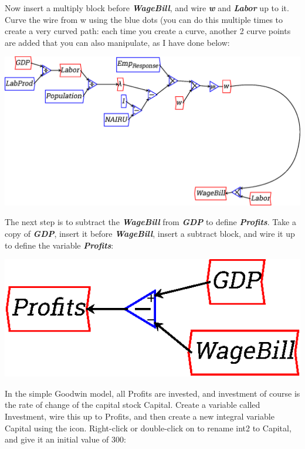 Now insert a multiply block before {\bf\em WageBill}, and wire {\bf\em
w} and {\bf\em Labor} up to it. Curve the wire from w using the blue
dots (you can do this multiple times to create a very curved path:
each time you create a curve, another 2 curve points are added that
you can also manipulate, as I have done below: 

\begin{center}
\includegraphics{images/NewItem114.eps}
\end{center}


The next step is to subtract the {\bf\em WageBill} from {\bf\em GDP}
to define {\bf\em Profits}. Take a copy of {\bf\em GDP}, insert it
before {\bf\em WageBill}, insert a subtract block, and wire it up to
define the variable {\bf\em Profits}:

\begin{center}
\includegraphics{images/NewItem100.eps}
\end{center}


In the simple Goodwin model, all Profits are invested, and investment
of course is the rate of change of the capital stock Capital. Create a
variable called Investment, wire this up to Profits, and then create a
new integral variable Capital using the 
icon. Right-click or double-click on to rename int2 to Capital, and
give it an initial value of 300: 

